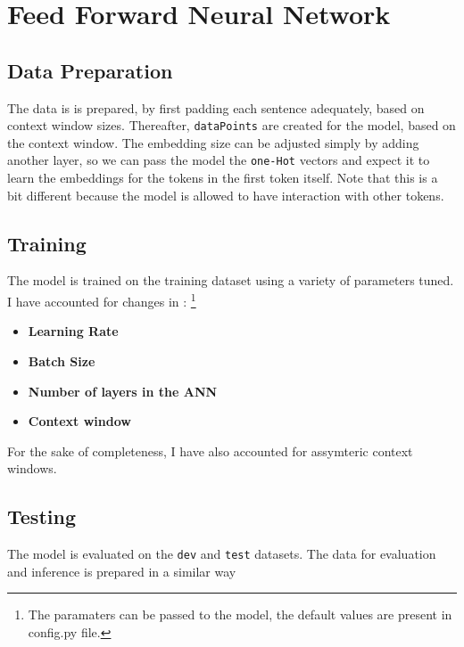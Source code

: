 \section*{Feed Forward Neural Network}

\subsection*{Data Preparation}
The data is is prepared, by first padding each sentence adequately, based on context window sizes. Thereafter, \verb|dataPoints| are created for the model, based on the context window. The embedding size can be adjusted simply by adding another layer, so we can pass the model the \verb|one-Hot| vectors and expect it to learn the embeddings for the tokens in the first token itself. Note that this is a bit different because the model is allowed to have interaction with other tokens.

\subsection*{Training}
The model is trained on the training dataset using a variety of parameters tuned. I have accounted for changes in : \footnote{The paramaters can be passed to the model, the default values are present in config.py file.}

\begin{itemize}
    \item \textbf{Learning Rate}
    \item \textbf{Batch Size}
    \item \textbf{Number of layers in the ANN}
    \item \textbf{Context window}
\end{itemize}

For the sake of completeness, I have also accounted for assymteric context windows.

\subsection*{Testing}
The model is evaluated on the \verb|dev| and \verb|test| datasets. The data for evaluation and inference is prepared in a similar way

